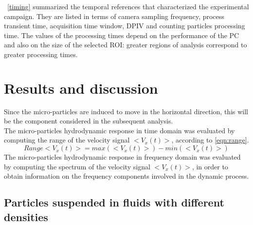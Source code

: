 \documentclass[journal]{IEEEtran}
\theoremstyle{definition}
\theoremstyle{remark}
\begin{document}
~\tab\ref{timing} summarized the temporal references that characterized the experimental campaign. They are listed in terms of camera sampling frequency, process transient time, acquisition time window, DPIV and counting particles processing time. 
The values of the processing times depend on the performance of the PC and also on the size of the selected ROI: greater regions of analysis correspond to greater processing times.


\section{Results and discussion}
Since the micro-particles are induced to move in the horizontal direction, this will be the component considered in the subsequent analysis. 
\\The micro-particles hydrodynamic response in time domain was evaluated by computing the range of the velocity signal $<V_x(t)>$, according to \DS{\eqn} \ref{eqn:range}. 
\begin{equation}
	\label{eqn:range}
	Range<V_x(t)>=max(<V_x(t)>)-min(<V_x(t)>)
\end{equation}
The micro-particles hydrodynamic response in frequency domain was evaluated by computing the spectrum of the velocity signal $<V_x(t)>$, in order to obtain information on the frequency components involved in the dynamic process.

\subsection{Particles suspended in fluids with different densities}\label{sec:suspended-particles}
\end{document}
